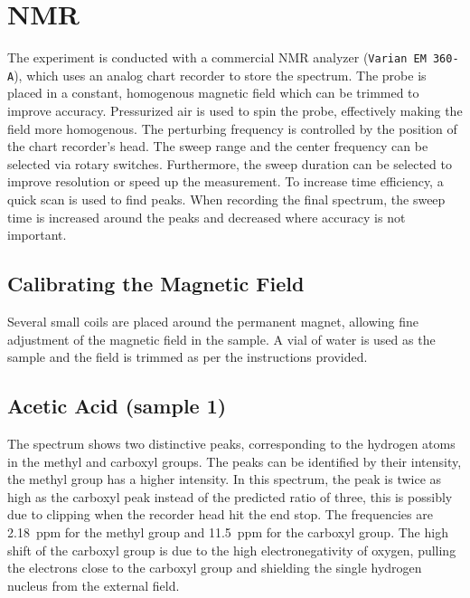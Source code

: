 \chapter{NMR}
The experiment is conducted with a commercial NMR analyzer (\texttt{Varian EM 360-A}), which uses an analog chart recorder to store the spectrum.
The probe is placed in a constant, homogenous magnetic field which can be trimmed to improve accuracy.
Pressurized air is used to spin the probe, effectively making the field more homogenous. %
The perturbing frequency is controlled by the position of the chart recorder's head.
The sweep range and the center frequency can be selected via rotary switches.
Furthermore, the sweep duration can be selected to improve resolution or speed up the measurement.
To increase time efficiency, a quick scan is used to find peaks.
When recording the final spectrum, the sweep time is increased around the peaks and decreased where accuracy is not important.

\section{Calibrating the Magnetic Field}
Several small coils are placed around the permanent magnet, allowing fine adjustment of the magnetic field in the sample.
A vial of water is used as the sample and the field is trimmed as per the instructions provided.


\section{Acetic Acid (sample 1)}
The spectrum shows two distinctive peaks, corresponding to the hydrogen atoms in the methyl and carboxyl groups.
The peaks can be identified by their intensity, the methyl group has a higher intensity.
In this spectrum, the peak is twice as high as the carboxyl peak instead of the predicted ratio of three, this is possibly due to clipping when the recorder head hit the end stop.
The frequencies are \SI{2.18}{ppm} for the methyl group and \SI{11.5}{ppm} for the carboxyl group.
The high shift of the carboxyl group is due to the high electronegativity of oxygen, pulling the electrons close to the carboxyl group and shielding the single hydrogen nucleus from the external field.

